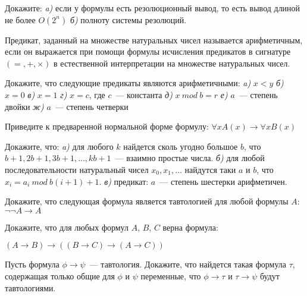 \setcounter{curtask}{6}


\begin{task}
    Докажите: {\it a)} если у формулы есть резолюционный вывод, то
    есть вывод длиной не более $O(2^n)$ {\it б)} полноту системы
    резолюций.
\end{task}

Предикат, заданный на множестве натуральных чисел называется
арифметичным, если он выражается при помощи формулы исчисления
предикатов в сигнатуре $(=, +, \times)$ в естественной интерпретации
на множестве натуральных чисел.

\begin{task}
    Докажите, что следующие предикаты являются арифметичными:
    {\it a)} $x < y$
    {\it б)} $x = 0$
    {\it в)} $x = 1$
    {\it г)} $x = c$, где $c$~--- константа
    {\it д)} $x~mod~b = r$
    {\it е)} $a$~--- степень двойки
    {\it ж)} $a$~--- степень четверки
\end{task}

\begin{task}
    Приведите к предваренной нормальной форме формулу:
    $\forall x A(x) \rightarrow \forall x B(x)$
\end{task}

\begin{task}
    Докажите, что:
    {\it a)} для любого $k$ найдется сколь угодно большое $b$, что
    $b + 1, 2b + 1, 3b + 1, \dots, kb + 1$~--- взаимно простые числа.
    {\it б)} для любой последовательности натуральный чисел $x_0, x_1,
    \dots$ найдутся таки $a$ и $b$, что $x_i = a_i~ mod ~ b(i + 1) +
    1$.
    {\it в)} предикат: $a$~--- степень шестерки арифметичен.
\end{task}

\breakline

\begin{ptask}{1}
    Докажите, что следующая формула является тавтологией для любой
    формулы $A$: $\neg\neg A \rightarrow A$
\end{ptask}

\begin{ptask}{2}
    Докажите, что для любых формул $A$, $B$, $C$ верна формула:
    \begin{center}
        $(A \rightarrow B) \rightarrow ((B \rightarrow C) \rightarrow (A
	    \rightarrow C))$
    \end{center}
\end{ptask}

\begin{ptask}{5}
    Пусть формула $\phi \rightarrow \psi$~--- тавтология. Докажите,
    что найдется такая формула $\tau$, содержащая только общие для
    $\phi$ и $\psi$ переменные, что $\phi \rightarrow \tau$ и
    $\tau \rightarrow \psi$ будут тавтологиями.
\end{ptask}